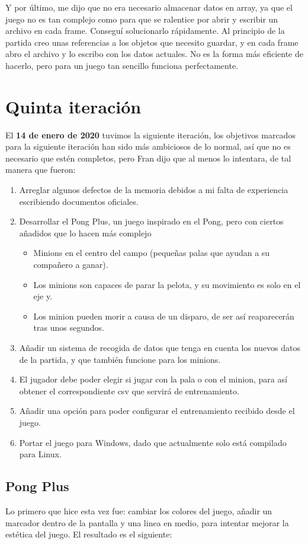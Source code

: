 Y por último, me dijo que no era necesario almacenar datos en array, ya que el juego no es tan complejo como para que se ralentice por abrir y escribir un archivo en cada frame. Conseguí solucionarlo rápidamente. Al principio de la partida creo unas referencias a los objetos que necesito guardar, y en cada frame abro el archivo y lo escribo con los datos actuales. No es la forma más eficiente de hacerlo, pero para un juego tan sencillo funciona perfectamente.

\section{Quinta iteración}
El \textbf{14 de enero de 2020} tuvimos la siguiente iteración, los objetivos marcados para la siguiente iteración han sido más ambiciosos de lo normal, así que no es necesario que estén completos, pero Fran dijo que al menos lo intentara, de tal manera que fueron:
\begin{enumerate}
	\item Arreglar algunos defectos de la memoria debidos a mi falta de experiencia escribiendo documentos oficiales.
	\item Desarrollar el Pong Plus, un juego inspirado en el Pong, pero con ciertos añadidos que lo hacen más complejo
	\begin{itemize}
		\item Minions en el centro del campo (pequeñas palas que ayudan a su compañero a ganar).
		\item Los minions son capaces de parar la pelota, y su movimiento es solo en el eje y.
		\item Los minion pueden morir a causa de un disparo, de ser así reaparecerán tras unos segundos.
	\end{itemize}
	\item Añadir un sistema de recogida de datos que tenga en cuenta los nuevos datos de la partida, y que también funcione para los minions.
	\item El jugador debe poder elegir si jugar con la pala o con el minion, para así obtener el correspondiente \gls{csv} que servirá de entrenamiento.
	\item Añadir una opción para poder configurar el entrenamiento recibido desde el juego.
	\item Portar el juego para Windows, dado que actualmente solo está compilado para Linux.
\end{enumerate}

\subsection{Pong Plus}
Lo primero que hice esta vez fue: cambiar los colores del juego, añadir un marcador dentro de la pantalla y una linea en medio, para intentar mejorar la estética del juego. El resultado es el siguiente:


